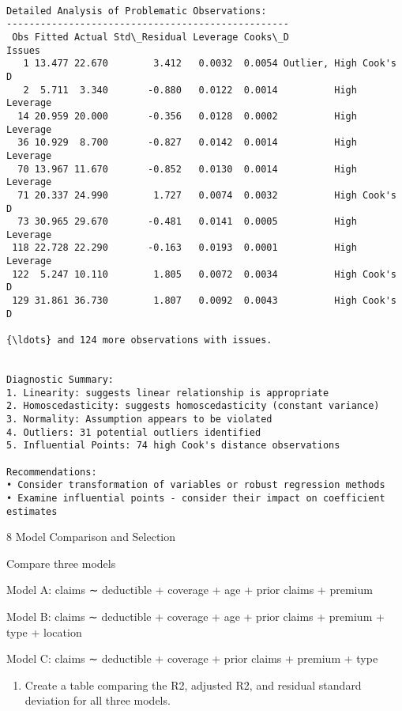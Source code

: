 \documentclass[8pt, twocolumn]{extarticle}
\providecommand{\tightlist}{%
      \setlength{\itemsep}{0pt}\setlength{\parskip}{0pt}}
\begin{document}
    
    \begin{Verbatim}[commandchars=\\\{\}]

Detailed Analysis of Problematic Observations:
--------------------------------------------------
 Obs Fitted Actual Std\_Residual Leverage Cooks\_D                 Issues
   1 13.477 22.670        3.412   0.0032  0.0054 Outlier, High Cook's D
   2  5.711  3.340       -0.880   0.0122  0.0014          High Leverage
  14 20.959 20.000       -0.356   0.0128  0.0002          High Leverage
  36 10.929  8.700       -0.827   0.0142  0.0014          High Leverage
  70 13.967 11.670       -0.852   0.0130  0.0014          High Leverage
  71 20.337 24.990        1.727   0.0074  0.0032          High Cook's D
  73 30.965 29.670       -0.481   0.0141  0.0005          High Leverage
 118 22.728 22.290       -0.163   0.0193  0.0001          High Leverage
 122  5.247 10.110        1.805   0.0072  0.0034          High Cook's D
 129 31.861 36.730        1.807   0.0092  0.0043          High Cook's D

{\ldots} and 124 more observations with issues.


Diagnostic Summary:
1. Linearity: suggests linear relationship is appropriate
2. Homoscedasticity: suggests homoscedasticity (constant variance)
3. Normality: Assumption appears to be violated
4. Outliers: 31 potential outliers identified
5. Influential Points: 74 high Cook's distance observations

Recommendations:
• Consider transformation of variables or robust regression methods
• Examine influential points - consider their impact on coefficient estimates
    \end{Verbatim}

    8 Model Comparison and Selection

Compare three models

Model A: claims ∼ deductible + coverage + age + prior claims + premium

Model B: claims ∼ deductible + coverage + age + prior claims + premium +
type + location

Model C: claims ∼ deductible + coverage + prior claims + premium + type

    \begin{enumerate}
\def\labelenumi{(\alph{enumi})}
\tightlist
\item
  Create a table comparing the R2, adjusted R2, and residual standard
  deviation for all three models.
\end{enumerate}
\end{document}
